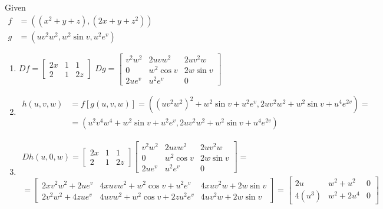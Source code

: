 \documentclass[twoside]{amsart}
\theoremstyle{plain}
\theoremstyle{definition}
\newcommand{\exercisehead}[1]
  {
   \noindent{\small\bf Exercise #1.}
   \smallskip}
\begin{document}
\exercisehead{15} Given \\
$\begin{aligned}
  f & = ((x^2 + y + z),(2x + y+z^2)) \\
  g & = (uv^2 w^2 , w^2 \sin{v}, u^2 e^v )
\end{aligned}$
\begin{enumerate}
\item $Df = \left[ \begin{matrix} 2x & 1 & 1 \\ 2 & 1 & 2z \end{matrix} \right]$ \quad \quad $Dg = \left[ \begin{matrix} v^2 w^2 & 2uvw^2 & 2uv^2 w \\ 
    0 & w^2 \cos{v} & 2w \sin{v} \\ 2u e^v & u^2 e^v & 0 \end{matrix} \right]$ 
\item \[
\begin{aligned}
  h(u,v,w) & = f[g(u,v,w)] = ((uv^2 w^2)^2 + w^2 \sin{v} + u^2 e^v, 2uv^2 w^2 + w^2 \sin{v} + u^4 e^{2v} ) = \\
  & = (u^2 v^4 w^4 + w^2 \sin{v} + u^2 e^v, 2uv^2 w^2 + w^2 \sin{v} + u^4 e^{2v} )
\end{aligned}
\]
\item \begin{multline*}
  Dh(u,0,w) = \left[ \begin{matrix} 2x & 1 & 1 \\ 2 & 1 & 2z \end{matrix} \right]\left[ \begin{matrix} v^2 w^2 & 2uvw^2 & 2uv^2 w \\ 0 & w^2 \cos{v} & 2w \sin{v} \\ 2u e^v & u^2 e^v & 0 \end{matrix} \right] = \\
  = \left[ \begin{matrix} 2xv^2 w^2 + 2u e^v & 4x uvw^2 + w^2 \cos{v} + u^2 e^v & 4xu v^2 w + 2w \sin{v} \\ 2v^2 w^2 + 4z ue^v & 4uvw^2 + w^2 \cos{v} + 2z u^2 e^v & 4uv^2 w + 2w \sin{v} \end{matrix} \right] = \left[ \begin{matrix} 2u & w^2 + u^2 & 0 \\ 4(u^3) & w^2 + 2u^4 & 0 \end{matrix} \right]
\end{multline*}
\end{enumerate}
\end{document}
